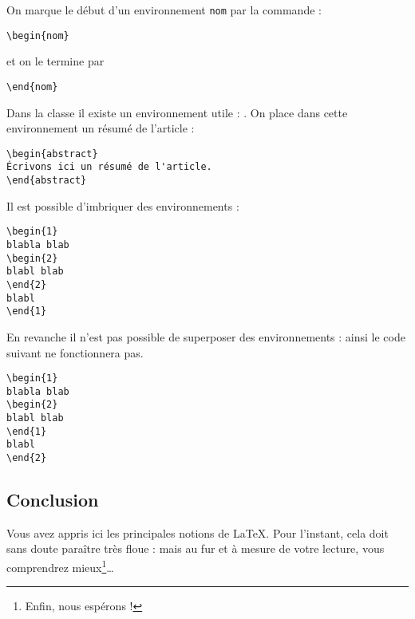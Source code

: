 On marque le début d'un environnement  \verb|nom| par la commande  :

\begin{verbatim}
\begin{nom}
\end{verbatim}

et on le termine par 
\begin{verbatim}
\end{nom}
\end{verbatim}


Dans la classe  il existe un environnement utile : . On place dans cette environnement un résumé de l'article :

\begin{verbatim}
\begin{abstract}
Écrivons ici un résumé de l'article. 
\end{abstract}
\end{verbatim}


Il est possible d'imbriquer des environnements :

\begin{verbatim}
\begin{1}
blabla blab
\begin{2}
blabl blab
\end{2}
blabl
\end{1}
\end{verbatim}


En revanche il n'est pas possible de superposer des environnements : ainsi le code suivant ne fonctionnera pas.


\begin{verbatim}
\begin{1}
blabla blab
\begin{2}
blabl blab
\end{1}
blabl
\end{2}
\end{verbatim}

\subsection{Conclusion}

Vous avez appris ici les principales notions de \LaTeX. Pour l'instant, cela doit sans doute paraître très floue : mais au fur et à mesure de votre lecture, vous comprendrez mieux\footnote{Enfin, nous espérons !}\ldots


